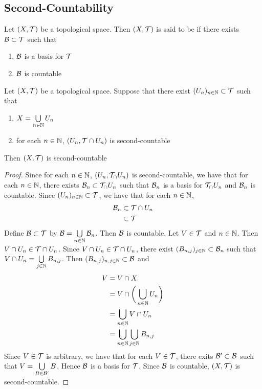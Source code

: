\documentclass{book}
\begin{document}
	\subsection{Second-Countability}

	\begin{defn}
		Let $(X, \mathcal{T})$ be a topological space. Then $(X, \mathcal{T})$ is said to be  if there exists $\mathcal{B} \subset \mathcal{T}$ such that 
		\begin{enumerate}
			\item $\mathcal{B}$ is a basis for $\mathcal{T}$
			\item $\mathcal{B}$ is countable
		\end{enumerate} 
	\end{defn}

	\begin{ex}
		Let $(X, \mathcal{T})$ be a topological space. Suppose that there exist $(U_n)_{n \in \mathbb{N}} \subset \mathcal{T}$ such that 
		\begin{enumerate}
			\item $X = \bigcup\limits_{n \in \mathbb{N}}U_n$
			\item for each $n \in \mathbb{N}$, $(U_n, \mathcal{T} \cap U_n)$ is second-countable
		\end{enumerate}
		Then $(X, \mathcal{T})$ is second-countable
	\end{ex}
	
	\begin{proof}
		Since for each $n \in \mathbb{N}$, $(U_n, \mathcal{T}_ \cap U_n)$ is second-countable, we have that for each $n \in \mathbb{N}$, there exists $\mathcal{B}_n \subset \mathcal{T}_ \cap U_n$ such that $\mathcal{B}_n$ is a basis for $\mathcal{T}_ \cap U_n$ and $\mathcal{B}_n$ is countable. Since $(U_n)_{n \in \mathbb{N}} \subset \mathcal{T}$, we have that for each $n \in \mathbb{N}$,
		\begin{align*}
			\mathcal{B}_n 
			& \subset \mathcal{T} \cap U_n \\
			& \subset \mathcal{T} 
		\end{align*}
		Define $\mathcal{B} \subset \mathcal{T}$ by $\mathcal{B} = \bigcup\limits_{n \in \mathbb{N}} \mathcal{B}_n$. Then $\mathcal{B}$ is countable. 
		Let $V \in \mathcal{T}$ and $n \in \mathbb{N}$. Then $V \cap U_n \in \mathcal{T} \cap U_n$. Since $V \cap U_n \in \mathcal{T} \cap U_n$, there exist $(B_{n, j})_{j \in \mathbb{N}} \subset \mathcal{B}_n$ such that $V \cap U_n = \bigcup\limits_{j \in \mathbb{N}} B_{n,j}$.
		Then $(B_{n,j})_{n,j \in \mathbb{N}} \subset \mathcal{B}$ and 
		\begin{align*}
			V
			& = V \cap X \\
			& = V \cap \bigg( \bigcup_{n \in \mathbb{N}} U_n \bigg) \\
			& = \bigcup_{n \in \mathbb{N}} V \cap U_n \\
			& = \bigcup_{n \in \mathbb{N}} \bigcup_{j \in \mathbb{N}} B_{n,j} 
		\end{align*}
		Since $V \in \mathcal{T}$ is arbitrary, we have that for each $V \in \mathcal{T}$, there exits $\mathcal{B}' \subset \mathcal{B}$ such that $V = \bigcup\limits_{B \in \mathcal{B}'} B$. Hence $\mathcal{B}$ is a basis for $\mathcal{T}$. Since $\mathcal{B}$ is countable, $(X, \mathcal{T})$ is second-countable.
	\end{proof}
\end{document}
